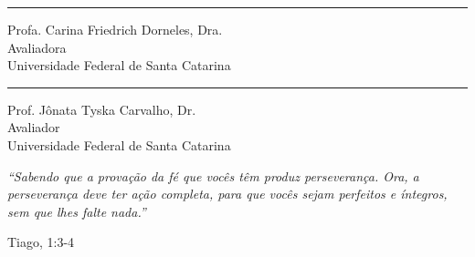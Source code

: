 \documentclass[
  12pt,
  oneside,
  a4paper,
  chapter=TITLE,
  section=TITLE,
  english,
  brazil,
]{abntex2}
\newcommand\blankpage{%
  \null
  \thispagestyle{empty}%
  \addtocounter{page}{-1}%
\newpage}
\begin{document}
\begin{folhadeaprovacao}
\begin{center}
    \vspace{1.5\onelineskip}

    \rule{6cm}{1pt}

    Profa. Carina Friedrich Dorneles, Dra.\\
    Avaliadora\\
    Universidade Federal de Santa Catarina

    \vspace{1.5\onelineskip}

    \rule{6cm}{1pt}

    Prof. Jônata Tyska Carvalho, Dr.\\
    Avaliador\\
    Universidade Federal de Santa Catarina

  \end{center}
\end{folhadeaprovacao}

\afterpage{\blankpage}

\begin{epigrafe}
  \thispagestyle{empty}
  \vspace*{\fill}
  \noindent\hspace{8cm}%
  \begin{minipage}{\dimexpr\textwidth-8cm\relax}
    \SingleSpacing
    \fontsize{11pt}{13pt}\selectfont
    \setlength{\parindent}{0pt}
    \setlength{\parskip}{0pt}
    \textit{``Sabendo que a provação da fé que vocês têm produz perseverança.
    Ora, a perseverança deve ter ação completa, para que vocês sejam perfeitos
    e íntegros, sem que lhes falte nada.''}

    \vspace{0.5\baselineskip}
    {\raggedleft Tiago, 1:3-4\par}
  \end{minipage}
\end{epigrafe}

\end{document}
